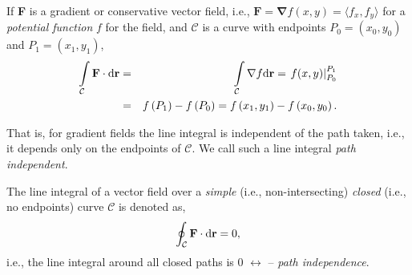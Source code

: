 \begin{theorem}
   If {\bf F} is a gradient or conservative vector field, i.e., $\mathbf{F}=\mathbf{\nabla}f(x,y)=\langle f_{x}, f_{y}\rangle$ for a {\it potential function} $f$ for the field, and $\mathcal{C}$ is a curve with endpoints $P_{0}=\left(x_{0},y_{0}\right)$ and $P_{1}=\left(x_{1},y_{1}\right)$,
      \begin{eqnarray}
         \int\limits_{\mathcal{C}}\mathbf{F}\cdot\mathrm{d}{\mathbf{r}} &=& \int\limits_{\mathcal{C}}\mathbf{\nabla}f\mathrm{d}{\mathbf{r}} = \left.f(x,y)\right|_{P_{0}}^{P_{1}}\\
                                                           &=& f\left(P_{1}\right)-f\left(P_{0}\right) = f\left(x_{1},y_{1}\right) - f\left(x_{0},y_{0}\right)\nonumber.
      \end{eqnarray}
\end{theorem} 
That is, for gradient fields the line integral is independent of the path taken, i.e., it depends only on the endpoints of $\mathcal{C}$. We call such a line integral {\it path independent}.
\medskip

The line integral of a vector field over a {\it simple} (i.e., non-intersecting) {\it closed} (i.e., no endpoints) curve $\mathcal{C}$ is denoted as,
        \begin{equation}
           \oint_{\mathcal{C}}\mathbf{F}\cdot\mathrm{d}{\mathbf{r}} = 0,
        \end{equation}
i.e., the line integral around all closed paths is 0 $\leftrightarrow$ -- {\it path independence}. \cite{NumericalRecipes,Atkinson_Book}
